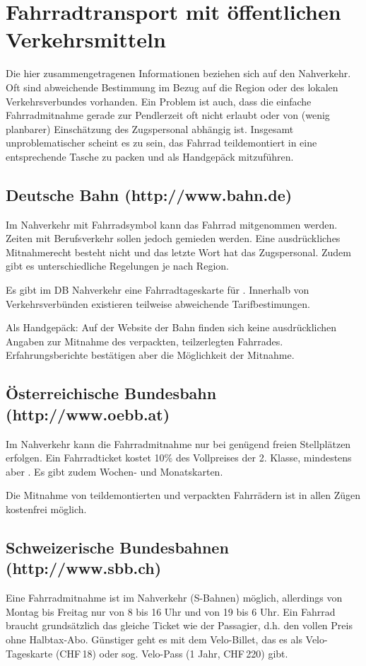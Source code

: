 \documentclass[a4paper,DIV13,BCOR1cm]{scrbook}
\begin{document}
\section{Fahrradtransport mit öffentlichen Verkehrsmitteln}

Die hier zusammengetragenen Informationen beziehen sich auf den Nahverkehr.
Oft sind abweichende Bestimmung im Bezug auf die Region oder des lokalen Verkehrsverbundes vorhanden.
Ein Problem ist auch, dass die einfache Fahrradmitnahme gerade zur Pendlerzeit oft nicht erlaubt oder
von (wenig planbarer) Einschätzung des Zugspersonal abhängig ist.
Insgesamt unproblematischer scheint es zu sein, das Fahrrad teildemontiert in eine entsprechende Tasche zu packen und als Handgepäck mitzuführen.

\subsection{Deutsche Bahn (http://www.bahn.de)}
Im Nahverkehr mit Fahrradsymbol kann das Fahrrad mitgenommen werden.
Zeiten mit Berufsverkehr sollen jedoch gemieden werden.
Eine ausdrückliches Mitnahmerecht besteht nicht und das letzte Wort hat das Zugspersonal. Zudem gibt es unterschiedliche Regelungen je nach Region.

Es gibt im DB Nahverkehr eine Fahrradtageskarte für . Innerhalb von Verkehrsverbünden existieren teilweise abweichende Tarifbestimungen.

Als Handgepäck: Auf der Website der Bahn finden sich keine ausdrücklichen Angaben zur Mitnahme des verpackten, teilzerlegten Fahrrades.
Erfahrungsberichte bestätigen aber die Möglichkeit der Mitnahme.

\subsection{Österreichische Bundesbahn (http://www.oebb.at)}
Im Nahverkehr kann die Fahrradmitnahme nur bei genügend freien Stellplätzen erfolgen.
Ein Fahrradticket kostet 10\% des Vollpreises der 2. Klasse, mindestens aber .
Es gibt zudem Wochen- und Monatskarten.

Die Mitnahme von teildemontierten und verpackten Fahrrädern ist in allen Zügen kostenfrei möglich.

\subsection{Schweizerische Bundesbahnen (http://www.sbb.ch)}
Eine Fahrradmitnahme ist im Nahverkehr (S-Bahnen) möglich, allerdings von Montag bis Freitag nur von 8 bis 16 Uhr und von 19 bis 6 Uhr.
Ein Fahrrad braucht grundsätzlich das gleiche Ticket wie der Passagier, d.h. den vollen Preis ohne Halbtax-Abo.
Günstiger geht es mit dem Velo-Billet, das es als Velo-Tageskarte (CHF\,18) oder sog. Velo-Pass (1 Jahr, CHF\,220) gibt.
\end{document}
